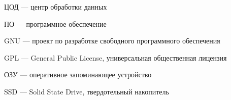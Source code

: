 
ЦОД --- центр обработки данных

ПО --- программное обеспечение

GNU --- проект по разработке свободного программного обеспечения

GPL --- General Public License, универсальная общественная лицензия

ОЗУ --- оперативное запоминающее устройство

SSD --- Solid State Drive, твердотельный накопитель


\clearpage
